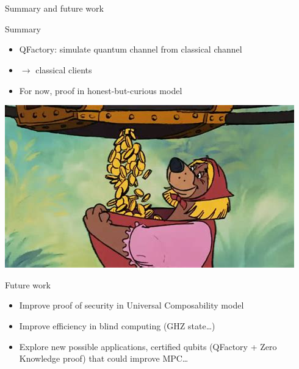 \documentclass[]{beamer}
\begin{document}
\section{}
\begin{frame}{Summary and future work}
  \begin{block}{Summary}
    \begin{minipage}{.6\linewidth}
      \begin{itemize}
      \item QFactory: simulate quantum channel from classical channel
      \item {} $\rightarrow$ classical clients
      \item For now, proof in honest-but-curious model
      \end{itemize}      
    \end{minipage}%
    \begin{minipage}{.4\linewidth}
      \includegraphics[width=\textwidth]{figures/money_fille.jpeg}        
    \end{minipage}
  \end{block}
  \begin{exampleblock}{Future work}
    \begin{itemize}
    \item Improve proof of security in Universal Composability model
    \item Improve efficiency in blind computing (GHZ state\dots)
    \item Explore new possible applications, certified qubits (QFactory + Zero Knowledge proof) that could improve MPC\dots
    \end{itemize}
  \end{exampleblock}
\end{frame}

\end{document}
